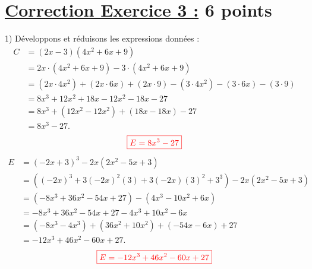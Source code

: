 \documentclass[12pt,a4paper]{article}
\begin{document}
\section*{\underline{Correction Exercice 3 :} 6 points}
1) Développons et réduisons les expressions données :
\begin{align*}
C &= (2x - 3)(4x^2 + 6x + 9) \\ 
  &= 2x \cdot (4x^2 + 6x + 9) - 3 \cdot (4x^2 + 6x + 9) \\ 
  &= (2x \cdot 4x^2) + (2x \cdot 6x) + (2x \cdot 9) - (3 \cdot 4x^2) - (3 \cdot 6x) - (3 \cdot 9) \\ 
  &= 8x^3 + 12x^2 + 18x - 12x^2 - 18x - 27 \\ 
  &= 8x^3 + (12x^2 - 12x^2) + (18x - 18x) - 27 \\ 
  &= 8x^3 - 27.
\end{align*}
$$\textcolor{red}{\boxed{E=8x^3 - 27}}$$
\begin{align*}
E &= (-2x + 3)^3 - 2x(2x^2 - 5x + 3) \\ 
  &= \left((-2x)^3 + 3(-2x)^2(3) + 3(-2x)(3)^2 + 3^3\right) - 2x(2x^2 - 5x + 3) \\ 
  &= \left(-8x^3 + 36x^2 - 54x + 27\right) - \left(4x^3 - 10x^2 + 6x\right) \\ 
  &= -8x^3 + 36x^2 - 54x + 27 - 4x^3 + 10x^2 - 6x \\ 
  &= (-8x^3 - 4x^3) + (36x^2 + 10x^2) + (-54x - 6x) + 27 \\ 
  &= -12x^3 + 46x^2 - 60x + 27.
\end{align*}
$$\textcolor{red}{\boxed{E=-12x^3 + 46x^2 - 60x + 27}}$$
\end{document}
